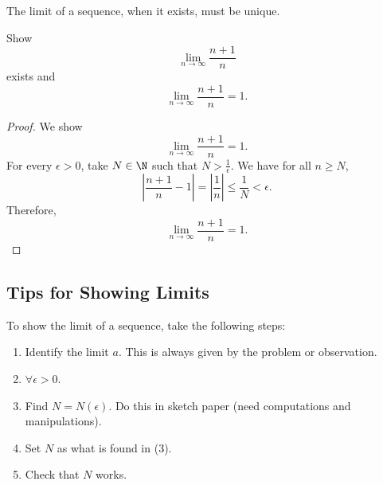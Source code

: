 \begin{theorem}
  The limit of a sequence, when it exists, must be
  unique.
\end{theorem}

\begin{exercise}
  Show
  \[\lim_{n \to \infty} \frac{n+1}{n}\]
  exists and
  \[\lim_{n \to \infty} \frac{n+1}{n} = 1.\]
\end{exercise}

\begin{proof}
  We show
  \[\lim_{n \to \infty} \frac{n+1}{n} = 1.\]
  For every $\epsilon > 0$, take $N \in \N$ such that
  $N > \frac{1}{\epsilon}$. We have for all $n \ge N$,
  \[
  \left|\frac{n+1}{n} - 1\right| = \left|\frac{1}{n}\right| \le \frac{1}{N} < \epsilon
  .\]
  Therefore,
  \[
    \lim_{n \to \infty} \frac{n+1}{n} = 1
  .\]
\end{proof}

\subsection{Tips for Showing Limits}
To show the limit of a sequence, take the following steps:
\begin{enumerate}
  \item Identify the limit $a$. This is always given
    by the problem or observation.
  \item $\forall \epsilon > 0$.
  \item Find $N = N(\epsilon)$. Do this in sketch paper
    (need computations and manipulations).
  \item Set $N$ as what is found in (3).
  \item Check that $N$ works.
\end{enumerate}
